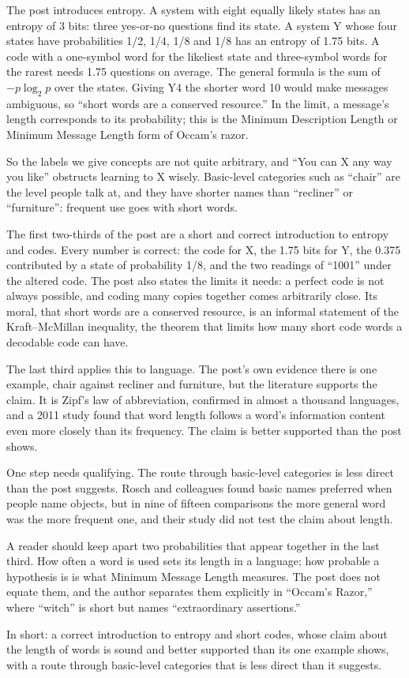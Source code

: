 \begin{afterword}
\summaryhead

The post introduces entropy. A system with eight equally likely states has an entropy of 3 bits: three yes-or-no questions find its state. A system Y whose four states have probabilities 1/2, 1/4, 1/8 and 1/8 has an entropy of 1.75 bits. A code with a one-symbol word for the likeliest state and three-symbol words for the rarest needs 1.75 questions on average. The general formula is the sum of $-p \log_2 p$ over the states. Giving Y4 the shorter word 10 would make messages ambiguous, so ``short words are a conserved resource.'' In the limit, a message's length corresponds to its probability; this is the Minimum Description Length or Minimum Message Length form of Occam's razor.

So the labels we give concepts are not quite arbitrary, and ``You can X any way you like'' obstructs learning to X wisely. Basic-level categories such as ``chair'' are the level people talk at, and they have shorter names than ``recliner'' or ``furniture'': frequent use goes with short words.

\responsehead

The first two-thirds of the post are a short and correct introduction to entropy and codes. Every number is correct: the code for X, the 1.75 bits for Y, the 0.375 contributed by a state of probability 1/8, and the two readings of ``1001'' under the altered code. The post also states the limits it needs: a perfect code is not always possible, and coding many copies together comes arbitrarily close. Its moral, that short words are a conserved resource, is an informal statement of the Kraft--McMillan inequality, the theorem that limits how many short code words a decodable code can have.

The last third applies this to language. The post's own evidence there is one example, chair against recliner and furniture, but the literature supports the claim. It is Zipf's law of abbreviation, confirmed in almost a thousand languages, and a 2011 study found that word length follows a word's information content even more closely than its frequency. The claim is better supported than the post shows.

One step needs qualifying. The route through basic-level categories is less direct than the post suggests. Rosch and colleagues found basic names preferred when people name objects, but in nine of fifteen comparisons the more general word was the more frequent one, and their study did not test the claim about length.

A reader should keep apart two probabilities that appear together in the last third. How often a word is used sets its length in a language; how probable a hypothesis is is what Minimum Message Length measures. The post does not equate them, and the author separates them explicitly in ``Occam's Razor,'' where ``witch'' is short but names ``extraordinary assertions.''

In short: a correct introduction to entropy and short codes, whose claim about the length of words is sound and better supported than its one example shows, with a route through basic-level categories that is less direct than it suggests.
\end{afterword}
